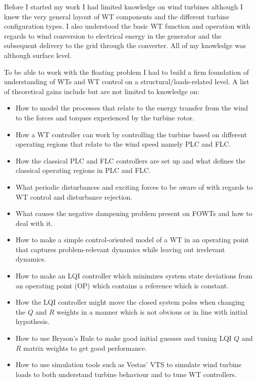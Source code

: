 \smallskip
Before I started my work I had limited knowledge on wind turbines although I knew the very general layout of WT components and the different turbine configuration types. I also understood the basic WT function and operation with regards to wind conversion to electrical energy in the generator and the subsequent delivery to the grid through the converter. All of my knowledge was although surface level.

To be able to work with the floating problem I had to build a firm foundation of understanding of WTs and WT control on a structural/loads-related level. A list of theoretical gains include but are not limited to knowledge on:
\begin{itemize}
	\item How to model the processes that relate to the energy transfer from the wind to the forces and torques experienced by the turbine rotor.
	\item How a WT controller can work by controlling the turbine based on different operating regions that relate to the wind speed namely PLC and FLC.
	\item How the classical PLC and FLC controllers are set up and what defines the classical operating regions in PLC and FLC.
	\item What periodic disturbances and exciting forces to be aware of with regards to WT control and disturbance rejection.
	\item What causes the negative dampening problem present on FOWTs and how to deal with it.
	\item How to make a simple control-oriented model of a WT in an operating point that captures problem-relevant dynamics while leaving out irrelevant dynamics.
	\item How to make an LQI controller which minimizes system state deviations from an operating point (OP) which contains a reference which is constant.
	\item How the LQI controller might move the closed system poles when changing the $ Q $ and $ R $ weights in a manner which is not obvious or in line with initial hypothesis.
	\item How to use Bryson's Rule to make good initial guesses and tuning LQI $ Q $ and $ R $ matrix weights to get good performance.
	\item How to use simulation tools such as Vestas' VTS to simulate wind turbine loads to both understand turbine behaviour and to tune WT controllers.
\end{itemize}

